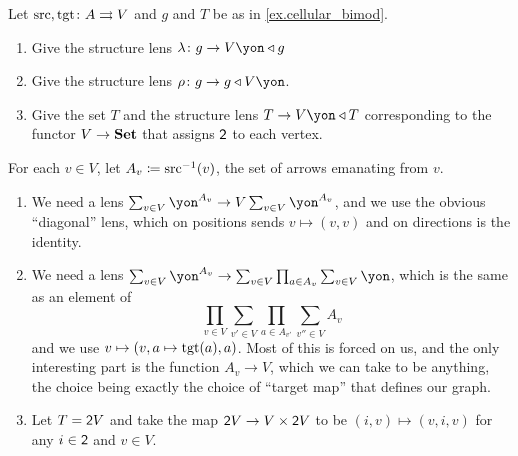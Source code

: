\documentclass[Book-Poly]{subfiles}
\begin{document}
\begin{exercise}\label{exc.cellular_bimod}
Let $\mathrm{src},\mathrm{tgt}\colon A\rightrightarrows V$ and $g$ and $T$ be as in \cref{ex.cellular_bimod}.
\begin{enumerate}
	\item Give the structure lens $\lambda\colon g\to V\yon\tri g$
	\item Give the structure lens $\rho\colon g\to g\tri V\yon$.
	\item Give the set $T$ and the structure lens $T\to V\yon\tri T$ corresponding to the functor $V\to\mathbf{Set}$ that assigns $\textsf{2}$ to each vertex.
\qedhere
\end{enumerate}
\begin{solution}
For each $v\in V$, let $A_v\coloneqq\mathrm{src}^{-1}(v)$, the set of arrows emanating from $v$.
\begin{enumerate}
    \item We need a lens $\sum_{v\in V}\yon^{A_v}\to V\sum_{v\in V}\yon^{A_v}$, and we use the obvious ``diagonal'' lens, which on positions sends $v\mapsto (v,v)$ and on directions is the identity.
    \item We need a lens $\sum_{v\in V}\yon^{A_v}\to\sum_{v\in V}\prod_{a\in A_v}\sum_{v\in V}\yon$, which is the same as an element of
    \[
    \prod_{v\in V}\sum_{v'\in V}\prod_{a\in A_{v'}}\sum_{v''\in V}A_v
    \]
    and we use $v\mapsto (v, a\mapsto\mathrm{tgt}(a), a)$. Most of this is forced on us, and the only interesting part is the function $A_v\to V$, which we can take to be anything, the choice being exactly the choice of ``target map'' that defines our graph.
    \item Let $T=\textsf{2}V$ and take the map $\textsf{2}V\to V\times \textsf{2}V$ to be $(i,v)\mapsto(v,i,v)$ for any $i\in \textsf{2}$ and $v\in V$.
\end{enumerate}
\end{solution}
\end{exercise}
\end{document}
